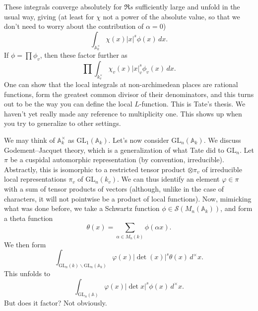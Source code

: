 \documentclass[reqno]{amsart} 
\numberwithin{theorem}{section}
\numberwithin{equation}{section}
\numberwithin{exercise}{section}
\begin{document}
These integrals converge absolutely for $\Re s$ sufficiently large and unfold in the usual way, giving
(at least for $\chi$ not a power of the absolute value, so that we don't need to worry about the contribution of $\alpha = 0$)
\begin{equation*}
  \int_{\mathbb{A}_k^\times} \chi(x) \lvert x \rvert^s \phi(x) \, d x.
\end{equation*}
If $\phi = \prod \phi_v$, then these factor further as
\begin{equation}\label{eq:cq6r32qpe5}
  \prod \int_{k_v^\times} \chi_v(x) \lvert x \rvert_v^s \phi_v(x) \, d x.
\end{equation}
One can show that the local integrals at non-archimedean places are rational functions, form the greatest common divisor of their denominators, and this turns out to be the way you can define the local $L$-function.  This is Tate's thesis.  We haven't yet really made any reference to multiplicity one.  This shows up when you try to generalize to other settings.

We may think of $\mathbb{A}_k^\times$ as $\mathrm{GL}_1(\mathbb{A}_k)$.  Let's now consider $\mathrm{GL}_n(\mathbb{A}_k)$.  We discuss Godement--Jacquet theory, which is a generalization of what Tate did to $\mathrm{GL}_n$.  Let $\pi$ be a cuspidal automorphic representation (by convention, irreducible).  Abstractly, this is isomorphic to a restricted tensor product $\otimes \pi_v$ of irreducible local representations $\pi_v$ of $\mathrm{GL}_n(k_v)$.  We can thus identify an element $\varphi \in \pi$ with a sum of tensor products of vectors (although, unlike in the case of characters, it will not pointwise be a product of local functions).  Now, mimicking what was done before, we take a Schwartz function $\phi \in \mathcal{S}(M_n(\mathbb{A}_k))$, and form a theta function
\begin{equation*}
  \theta(x)
  =
  \sum_{\alpha \in M_n(k)}
  \phi(\alpha x).
\end{equation*}
We then form
\begin{equation*}
  \int_{\mathrm{GL}_n(k) \backslash \mathrm{GL}_n(\mathbb{A}_k)}
  \varphi(x) \lvert \det(x) \rvert^s \theta(x) \,d^\times x.
\end{equation*}
This unfolds to
\begin{equation*}
  \int_{\mathrm{GL}_n(\mathbb{A})} \varphi(x) \lvert \det x \rvert^s \phi(x) \, d^\times x.
\end{equation*}
But does it factor?  Not obviously.
\end{document}
